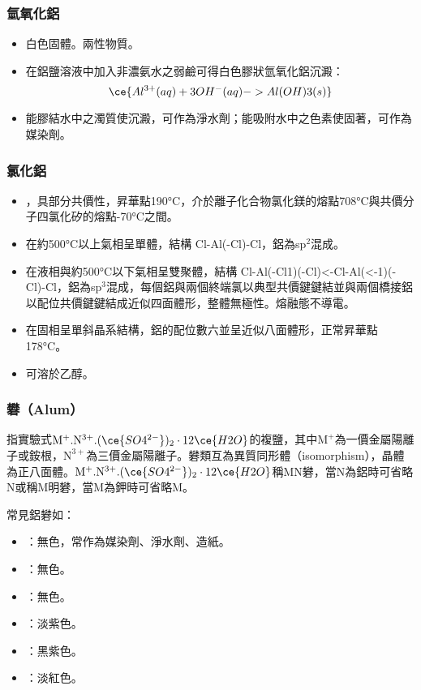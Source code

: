 \documentclass[a4paper,12pt]{report}
\begin{document}
\begin{itemize}
\begin{itemize}
\subsubsection{氫氧化鋁}
\begin{itemize}
\item 白色固體。兩性物質。
\item 在鋁鹽溶液中加入非濃氨水之弱鹼可得白色膠狀氫氧化鋁沉澱：
\[\ce{Al^{3+}(aq) + 3OH^-(aq) -> Al(OH)3(s)}\]
\item 能膠結水中之濁質使沉澱，可作為淨水劑；能吸附水中之色素使固著，可作為媒染劑。
\end{itemize}
\subsubsection{氯化鋁}
\begin{itemize}
\item {}，具部分共價性，昇華點190°C，介於離子化合物氯化鎂的熔點708°C與共價分子四氯化矽的熔點-70°C之間。
\item 在約500°C以上氣相呈單體，結構 Cl-Al(-Cl)-Cl，鋁為sp$^2$混成。
\item 在液相與約500°C以下氣相呈雙聚體，結構 Cl-Al(-Cl1)(-Cl)<-Cl-Al(<-1)(-Cl)-Cl，鋁為sp$^3$混成，每個鋁與兩個終端氯以典型共價鍵鍵結並與兩個橋接鋁以配位共價鍵鍵結成近似四面體形，整體無極性。熔融態不導電。
\item 在固相呈單斜晶系結構，鋁的配位數六並呈近似八面體形，正常昇華點 178°C。
\item 可溶於乙醇。
\end{itemize}
\subsubsection{礬（Alum）}
指實驗式$\mathrm{M}^+.\mathrm{N}^{3+}.(\ce{SO4^{2-}})_2\cdot 12\ce{H2O}$的複鹽，其中$\mathrm{M}^+$為一價金屬陽離子或銨根，$\mathrm{N}^{3+}$為三價金屬陽離子。礬類互為異質同形體（isomorphism），晶體為正八面體。$\mathrm{M}^+.\mathrm{N}^{3+}.(\ce{SO4^{2-}})_2\cdot 12\ce{H2O}$稱$\mathrm{M}\mathrm{N}$礬，當$\mathrm{N}$為鋁時可省略$\mathrm{N}$或稱$\mathrm{M}$明礬，當$\mathrm{M}$為鉀時可省略$\mathrm{M}$。

常見鋁礬如：
\begin{itemize}
\item {}：無色，常作為媒染劑、淨水劑、造紙。
\item {}：無色。
\item {}：無色。
\item {}：淡紫色。
\item {}：黑紫色。
\item {}：淡紅色。
\end{itemize}


\end{itemize}
\end{itemize}
\end{document}
